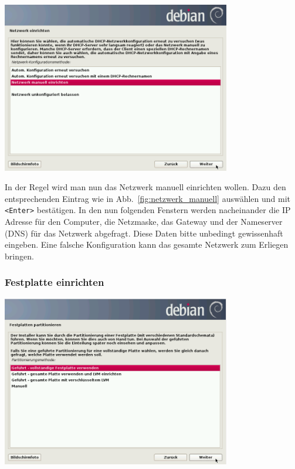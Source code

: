 \documentclass[a4paper,12pt,twoside]{article}
\begin{document}
\begin{minipage}{\linewidth}
    \centering
    \includegraphics[width=10cm]{efaLivede-img/efaLivede-img8.png}
    \label{fig:netzwerk_manuell}
\end{minipage}
\bigskip

In der Regel wird man nun das Netzwerk manuell einrichten wollen. Dazu
den entsprechenden Eintrag wie in Abb.~\ref{fig:netzwerk_manuell} auswählen und
mit \texttt{{\textless}Enter{\textgreater}} bestätigen. In den nun folgenden
Fenstern werden nacheinander die IP Adresse für den Computer, die
Netzmaske, das Gateway und der Nameserver (DNS) für das Netzwerk
abgefragt. Diese Daten bitte unbedingt gewissenhaft eingeben. Eine
falsche Konfiguration kann das gesamte Netzwerk zum Erliegen bringen.


\subsubsection{Festplatte einrichten}
\label{sct:inst_festplatte}

\begin{minipage}{\linewidth}
    \centering
    \includegraphics[width=10cm]{efaLivede-img/efaLivede-img9.png}
    \label{fig:partitionierung}
\end{minipage}
\bigskip
\end{document}
